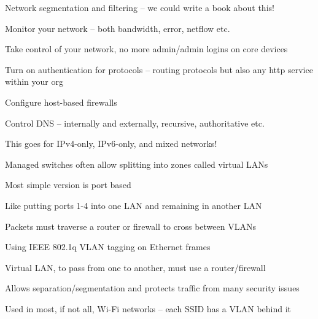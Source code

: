 \documentclass[Screen16to9,17pt]{foils}
\begin{document}
\begin{list2}
\item Network segmentation and filtering -- we could write a book about this! {\myalert}
\item Monitor your network -- both bandwidth, error, netflow etc. {\myalert}
\item Take control of your network, no more admin/admin logins on core devices {\myalert}
\item Turn on authentication for protocols -- routing protocols but also any http service within your org {\myalert}
\item Configure host-based firewalls {\myalert}
\item Control DNS -- internally and externally, recursive, authoritative etc. {\myalert}
\end{list2}

\centerline{This goes for IPv4-only, IPv6-only, and mixed networks!}



\begin{list1}
\item Managed switches often allow splitting into zones called virtual LANs
\item Most simple version is port based
\item Like putting ports 1-4 into one LAN and remaining in another LAN
\item Packets must traverse a router or firewall to cross between VLANs
\end{list1}



\begin{list1}
\item Using IEEE 802.1q  VLAN tagging on Ethernet frames
\item Virtual LAN, to pass from one to another, must use a router/firewall
\item Allows separation/segmentation and protects traffic from many security issues
\item Used in most, if not all, Wi-Fi networks -- each SSID has a VLAN behind it
\end{list1}


\end{document}
